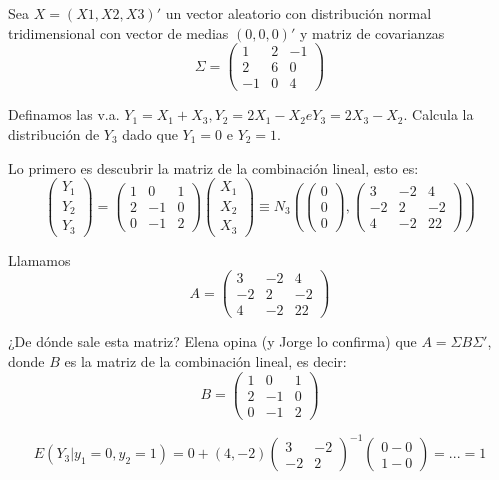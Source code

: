 \begin{problem}[7]
Sea $X = (X1,X2,X3)'$ un vector aleatorio con distribución normal tridimensional con vector de medias $(0,0,0)'$ y matriz de covarianzas
\[
Σ =
\begin{pmatrix}
1&2&−1\\
2&6&0\\
−1&0&4
\end{pmatrix}
\]


Definamos las v.a. $Y_1 = X_1 + X_3, Y_2 = 2X_1 − X_2 e Y_3 = 2X_3 − X_2$. Calcula la distribución de $Y_3$ dado que $Y_1=0$ e $Y_2=1$.

\solution

Lo primero es descubrir la matriz de la combinación lineal, esto es:
\[
\begin{pmatrix} Y_1\\Y_2\\Y_3\end{pmatrix} = \begin{pmatrix}1&0&1\\2&-1&0\\0&-1&2\end{pmatrix}\begin{pmatrix}X_1\\X_2\\X_3\end{pmatrix} \equiv N_3 \left( \begin{pmatrix}0\\0\\0\end{pmatrix}, \begin{pmatrix}3&-2&4\\-2&2&-2\\4&-2&22 \end{pmatrix} \right)
 \]

Llamamos \[A=\begin{pmatrix}3&-2&4\\-2&2&-2\\4&-2&22 \end{pmatrix}\]

¿De dónde sale esta matriz? Elena opina (y Jorge lo confirma) que $A = ΣBΣ'$, donde $B$ es la matriz de la combinación lineal, es decir: 
\[B=\begin{pmatrix}1&0&1\\2&-1&0\\0&-1&2\end{pmatrix}\]

\[
E(Y_3|y_1 = 0, y_2 = 1) = 0 + (4,-2) \begin{pmatrix} 3&-2\\-2&2\end{pmatrix}^{-1} \begin{pmatrix}0-0\\1-0\end{pmatrix} = ... = 1
\]


\end{problem}
